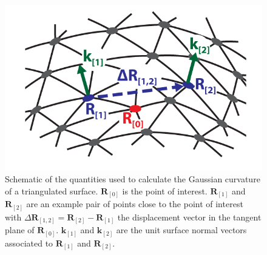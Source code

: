 \begin{figure}
  \centering
  \includegraphics{figures/C3/Ch3-Figs_CurvFitSchem.png}
  \caption{Schematic of the quantities used to calculate the Gaussian curvature of a triangulated surface.
  $\mathbf{R}_{[0]}$ is the point of interest.
  $\mathbf{R}_{[1]}$ and $\mathbf{R}_{[2]}$ are an example pair of points close to the point of interest with $\Delta \mathbf{R}_{[1,2]} = \mathbf{R}_{[2]}-\mathbf{R}_{[1]}$ the displacement vector in the tangent plane of $\mathbf{R}_{[0]}$.
  $\mathbf{k}_{[1]}$ and $\mathbf{k}_{[2]}$ are the unit surface normal vectors associated to $\mathbf{R}_{[1]}$ and $\mathbf{R}_{[2]}$.}\label{f:3-CurvFitSchem}
\end{figure}

